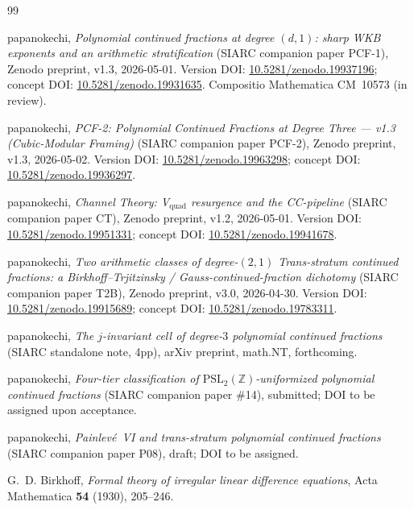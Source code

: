 \documentclass[11pt,a4paper]{article}
\theoremstyle{definition}
\theoremstyle{remark}
\newcommand{\PSLZ}{\mathrm{PSL}_2(\mathbb{Z})}
\begin{document}
\begin{thebibliography}{99}

papanokechi,
\emph{Polynomial continued fractions at degree $(d,1)$: sharp WKB exponents and an arithmetic stratification}
(SIARC companion paper PCF-1),
Zenodo preprint, v1.3, 2026-05-01.
Version DOI: \href{https://doi.org/10.5281/zenodo.19937196}{10.5281/zenodo.19937196};
concept DOI: \href{https://doi.org/10.5281/zenodo.19931635}{10.5281/zenodo.19931635}.
Compositio Mathematica CM~10573 (in review).

papanokechi,
\emph{PCF-2: Polynomial Continued Fractions at Degree Three --- v1.3 (Cubic-Modular Framing)}
(SIARC companion paper PCF-2),
Zenodo preprint, v1.3, 2026-05-02.
Version DOI: \href{https://doi.org/10.5281/zenodo.19963298}{10.5281/zenodo.19963298};
concept DOI: \href{https://doi.org/10.5281/zenodo.19936297}{10.5281/zenodo.19936297}.

papanokechi,
\emph{Channel Theory: V$_{\mathrm{quad}}$ resurgence and the CC-pipeline}
(SIARC companion paper CT),
Zenodo preprint, v1.2, 2026-05-01.
Version DOI: \href{https://doi.org/10.5281/zenodo.19951331}{10.5281/zenodo.19951331};
concept DOI: \href{https://doi.org/10.5281/zenodo.19941678}{10.5281/zenodo.19941678}.

papanokechi,
\emph{Two arithmetic classes of degree-$(2,1)$ Trans-stratum continued fractions: a Birkhoff--Trjitzinsky / Gauss-continued-fraction dichotomy}
(SIARC companion paper T2B),
Zenodo preprint, v3.0, 2026-04-30.
Version DOI: \href{https://doi.org/10.5281/zenodo.19915689}{10.5281/zenodo.19915689};
concept DOI: \href{https://doi.org/10.5281/zenodo.19783311}{10.5281/zenodo.19783311}.

papanokechi,
\emph{The $j$-invariant cell of degree-$3$ polynomial continued fractions} (SIARC standalone note, 4pp),
arXiv preprint, math.NT, forthcoming.

papanokechi,
\emph{Four-tier classification of $\PSLZ$-uniformized polynomial continued fractions}
(SIARC companion paper \#14),
submitted; DOI to be assigned upon acceptance.

papanokechi,
\emph{Painlev\'e~VI and trans-stratum polynomial continued fractions}
(SIARC companion paper P08),
draft; DOI to be assigned.

G.~D. Birkhoff,
\emph{Formal theory of irregular linear difference equations},
Acta Mathematica \textbf{54} (1930), 205--246.


\end{thebibliography}
\end{document}
